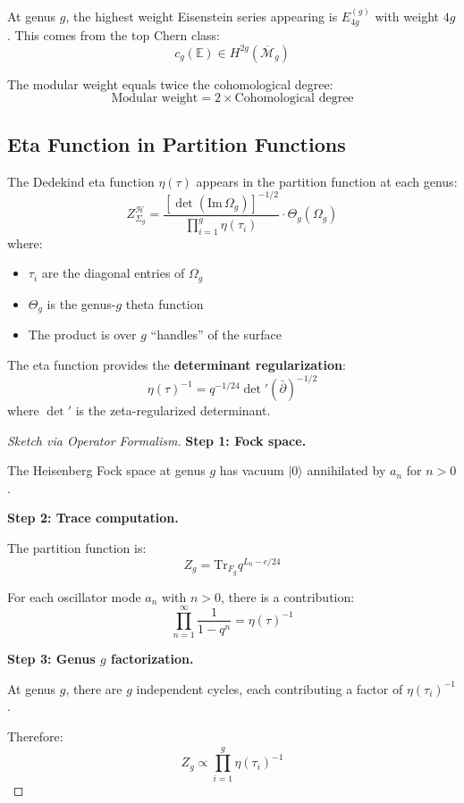 \begin{proposition}\label{prop:modular-weight-formula}
At genus $g$, the highest weight Eisenstein series appearing is $E_{4g}^{(g)}$ 
with weight $4g$. This comes from the top Chern class:
$$c_g(\mathbb{E}) \in H^{2g}(\overline{\mathcal{M}}_g)$$

The modular weight equals twice the cohomological degree:
$$\text{Modular weight} = 2 \times \text{Cohomological degree}$$
\end{proposition}

\subsection{Eta Function in Partition Functions}
\label{subsec:eta-partition-functions}

\begin{theorem}\label{thm:eta-appearance}
The Dedekind eta function $\eta(\tau)$ appears in the partition function at each genus:
\begin{equation}
Z_{\Sigma_g}^{\mathcal{H}} = \frac{[\det(\text{Im}\,\Omega_g)]^{-1/2}}
{\prod_{i=1}^{g} \eta(\tau_i)} \cdot \Theta_g(\Omega_g)
\end{equation}
where:
\begin{itemize}
\item $\tau_i$ are the diagonal entries of $\Omega_g$
\item $\Theta_g$ is the genus-$g$ theta function
\item The product is over $g$ ``handles'' of the surface
\end{itemize}

The eta function provides the \textbf{determinant regularization}:
$$\eta(\tau)^{-1} = q^{-1/24} \det'(\bar{\partial})^{-1/2}$$
where $\det'$ is the zeta-regularized determinant.
\end{theorem}

\begin{proof}[Sketch via Operator Formalism]

\textbf{Step 1: Fock space.}

The Heisenberg Fock space at genus $g$ has vacuum $|0\rangle$ annihilated by $a_n$ 
for $n > 0$.

\textbf{Step 2: Trace computation.}

The partition function is:
$$Z_g = \text{Tr}_{F_g} q^{L_0 - c/24}$$

For each oscillator mode $a_n$ with $n > 0$, there is a contribution:
$$\prod_{n=1}^{\infty} \frac{1}{1 - q^n} = \eta(\tau)^{-1}$$

\textbf{Step 3: Genus $g$ factorization.}

At genus $g$, there are $g$ independent cycles, each contributing a factor of 
$\eta(\tau_i)^{-1}$.

Therefore:
$$Z_g \propto \prod_{i=1}^{g} \eta(\tau_i)^{-1}$$
\end{proof}

